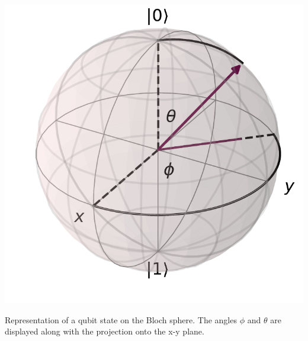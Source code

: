 \begin{marginfigure}
    \centering
    \includegraphics[]{Figs/Theory/bloch_sphere.pdf}
    \caption{Representation of a qubit state on the Bloch sphere. The angles $\phi$ and $\theta$ are displayed along with the projection onto the x-y plane.}
    \label{fig:bloch_sphere}
\end{marginfigure}



